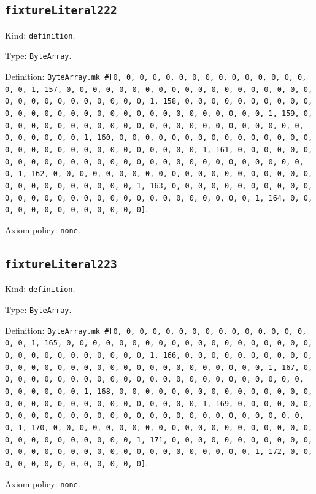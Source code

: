 \documentclass[11pt]{article}
\begin{document}
\subsection*{\texttt{fixtureLiteral222}}
\noindent Kind: \texttt{definition}.\par
\noindent Type: \texttt{ByteArray}.\par
\noindent Definition: \texttt{ByteArray.mk \#[0, 0, 0, 0, 0, 0, 0, 0, 0, 0, 0, 0, 0, 0, 0, 0, 0, 1, 157, 0, 0, 0, 0, 0, 0, 0, 0, 0, 0, 0, 0, 0, 0, 0, 0, 0, 0, 0, 0, 0, 0, 0, 0, 0, 0, 0, 0, 0, 0, 1, 158, 0, 0, 0, 0, 0, 0, 0, 0, 0, 0, 0, 0, 0, 0, 0, 0, 0, 0, 0, 0, 0, 0, 0, 0, 0, 0, 0, 0, 0, 0, 1, 159, 0, 0, 0, 0, 0, 0, 0, 0, 0, 0, 0, 0, 0, 0, 0, 0, 0, 0, 0, 0, 0, 0, 0, 0, 0, 0, 0, 0, 0, 0, 1, 160, 0, 0, 0, 0, 0, 0, 0, 0, 0, 0, 0, 0, 0, 0, 0, 0, 0, 0, 0, 0, 0, 0, 0, 0, 0, 0, 0, 0, 0, 0, 1, 161, 0, 0, 0, 0, 0, 0, 0, 0, 0, 0, 0, 0, 0, 0, 0, 0, 0, 0, 0, 0, 0, 0, 0, 0, 0, 0, 0, 0, 0, 0, 1, 162, 0, 0, 0, 0, 0, 0, 0, 0, 0, 0, 0, 0, 0, 0, 0, 0, 0, 0, 0, 0, 0, 0, 0, 0, 0, 0, 0, 0, 0, 0, 1, 163, 0, 0, 0, 0, 0, 0, 0, 0, 0, 0, 0, 0, 0, 0, 0, 0, 0, 0, 0, 0, 0, 0, 0, 0, 0, 0, 0, 0, 0, 0, 1, 164, 0, 0, 0, 0, 0, 0, 0, 0, 0, 0, 0, 0, 0]}.\par
\noindent Axiom policy: \texttt{none}.\par
\subsection*{\texttt{fixtureLiteral223}}
\noindent Kind: \texttt{definition}.\par
\noindent Type: \texttt{ByteArray}.\par
\noindent Definition: \texttt{ByteArray.mk \#[0, 0, 0, 0, 0, 0, 0, 0, 0, 0, 0, 0, 0, 0, 0, 0, 0, 1, 165, 0, 0, 0, 0, 0, 0, 0, 0, 0, 0, 0, 0, 0, 0, 0, 0, 0, 0, 0, 0, 0, 0, 0, 0, 0, 0, 0, 0, 0, 0, 1, 166, 0, 0, 0, 0, 0, 0, 0, 0, 0, 0, 0, 0, 0, 0, 0, 0, 0, 0, 0, 0, 0, 0, 0, 0, 0, 0, 0, 0, 0, 0, 1, 167, 0, 0, 0, 0, 0, 0, 0, 0, 0, 0, 0, 0, 0, 0, 0, 0, 0, 0, 0, 0, 0, 0, 0, 0, 0, 0, 0, 0, 0, 0, 1, 168, 0, 0, 0, 0, 0, 0, 0, 0, 0, 0, 0, 0, 0, 0, 0, 0, 0, 0, 0, 0, 0, 0, 0, 0, 0, 0, 0, 0, 0, 0, 1, 169, 0, 0, 0, 0, 0, 0, 0, 0, 0, 0, 0, 0, 0, 0, 0, 0, 0, 0, 0, 0, 0, 0, 0, 0, 0, 0, 0, 0, 0, 0, 1, 170, 0, 0, 0, 0, 0, 0, 0, 0, 0, 0, 0, 0, 0, 0, 0, 0, 0, 0, 0, 0, 0, 0, 0, 0, 0, 0, 0, 0, 0, 0, 1, 171, 0, 0, 0, 0, 0, 0, 0, 0, 0, 0, 0, 0, 0, 0, 0, 0, 0, 0, 0, 0, 0, 0, 0, 0, 0, 0, 0, 0, 0, 0, 1, 172, 0, 0, 0, 0, 0, 0, 0, 0, 0, 0, 0, 0, 0]}.\par
\noindent Axiom policy: \texttt{none}.\par
\end{document}
